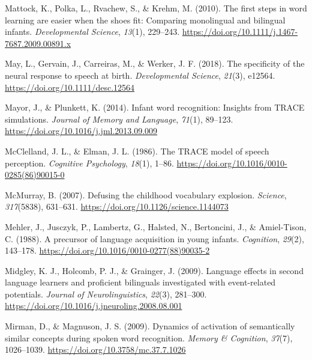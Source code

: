 \documentclass[
  12pt,
  b5paperpaper,
  twoside]{scrreprt}
\newlength{\cslhangindent}
\newlength{\cslentryspacingunit} %
\newenvironment{CSLReferences}[2] %
 {%
  \setlength{\parindent}{0pt}
  \ifodd #1
  \let\oldpar\par
  \def\par{\hangindent=\cslhangindent\oldpar}
  \fi
  \setlength{\parskip}{#2\cslentryspacingunit}
 }%
 {}
\begin{document}
\begin{CSLReferences}{1}{0}
\leavevmode{}%
Mattock, K., Polka, L., Rvachew, S., \& Krehm, M. (2010). The first
steps in word learning are easier when the shoes fit: Comparing
monolingual and bilingual infants. \emph{Developmental Science},
\emph{13}(1), 229--243.
\url{https://doi.org/10.1111/j.1467-7687.2009.00891.x}

\leavevmode{}%
May, L., Gervain, J., Carreiras, M., \& Werker, J. F. (2018). The
specificity of the neural response to speech at birth.
\emph{Developmental Science}, \emph{21}(3), e12564.
\url{https://doi.org/10.1111/desc.12564}

\leavevmode{}%
Mayor, J., \& Plunkett, K. (2014). Infant word recognition: Insights
from {TRACE} simulations. \emph{Journal of Memory and Language},
\emph{71}(1), 89--123. \url{https://doi.org/10.1016/j.jml.2013.09.009}

\leavevmode{}%
McClelland, J. L., \& Elman, J. L. (1986). The {TRACE} model of speech
perception. \emph{Cognitive Psychology}, \emph{18}(1), 1--86.
\url{https://doi.org/10.1016/0010-0285(86)90015-0}

\leavevmode{}%
McMurray, B. (2007). Defusing the childhood vocabulary explosion.
\emph{Science}, \emph{317}(5838), 631--631.
\url{https://doi.org/10.1126/science.1144073}

\leavevmode{}%
Mehler, J., Jusczyk, P., Lambertz, G., Halsted, N., Bertoncini, J., \&
Amiel-Tison, C. (1988). A precursor of language acquisition in young
infants. \emph{Cognition}, \emph{29}(2), 143--178.
\url{https://doi.org/10.1016/0010-0277(88)90035-2}

\leavevmode{}%
Midgley, K. J., Holcomb, P. J., \& Grainger, J. (2009). Language effects
in second language learners and proficient bilinguals investigated with
event-related potentials. \emph{Journal of Neurolinguistics},
\emph{22}(3), 281--300.
\url{https://doi.org/10.1016/j.jneuroling.2008.08.001}

\leavevmode{}%
Mirman, D., \& Magnuson, J. S. (2009). Dynamics of activation of
semantically similar concepts during spoken word recognition.
\emph{Memory \& Cognition}, \emph{37}(7), 1026--1039.
\url{https://doi.org/10.3758/mc.37.7.1026}


\end{CSLReferences}
\end{document}
